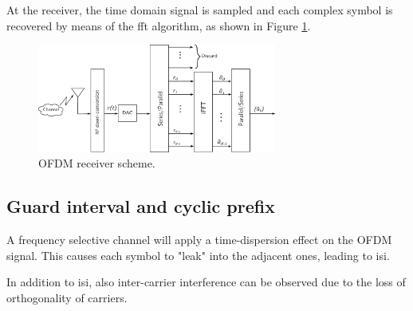 At the receiver, the time domain signal is sampled and each complex symbol is recovered by means of the \gls{fft} algorithm, as shown in Figure \ref{fig:ofdm_receive}.

\begin{figure}[H]
	\centering
	\includegraphics[width=0.7\textwidth]{Images/theoretical/ofdm/ofdm_receive.png}
	\caption{OFDM receiver scheme.}
	\label{fig:ofdm_receive}
\end{figure}

\subsection{Guard interval and cyclic prefix}
A frequency selective channel will apply a time-dispersion effect on the OFDM signal. This causes each symbol to "leak" into the adjacent ones, leading to \gls{isi}.

In addition to \gls{isi}, also inter-carrier interference can be observed due to the loss of orthogonality of carriers.

